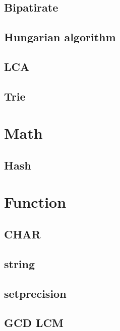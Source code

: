         \subsection{Bipatirate}
                
        \subsection{Hungarian algorithm}
                
        \subsection{LCA}
                
        \subsection{Trie}
                

\section{Math}
        \subsection{Hash}
                

\section{Function}
        \subsection{CHAR}
                
        \subsection{string}
                
        \subsection{setprecision}
                
        \subsection{GCD LCM}
                
